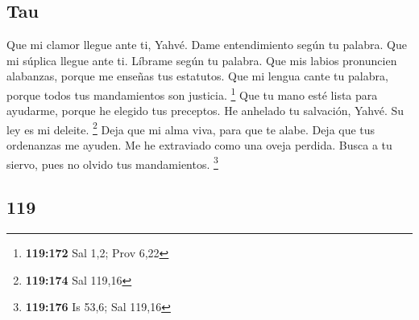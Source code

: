 \begin{paracol}{2}
\hypertarget{tau}{%
\subsection{Tau}\label{tau}}

 Que mi clamor llegue ante ti, Yahvé. Dame entendimiento
según tu palabra.  Que mi súplica llegue ante ti.
Líbrame según tu palabra.  Que mis labios pronuncien
alabanzas, porque me enseñas tus estatutos.  Que mi
lengua cante tu palabra, porque todos tus mandamientos son justicia.
\footnote{\textbf{119:172} Sal 1,2; Prov 6,22}  Que tu
mano esté lista para ayudarme, porque he elegido tus preceptos.
 He anhelado tu salvación, Yahvé. Su ley es mi deleite.
\footnote{\textbf{119:174} Sal 119,16}  Deja que mi alma
viva, para que te alabe. Deja que tus ordenanzas me ayuden.
 Me he extraviado como una oveja perdida. Busca a tu
siervo, pues no olvido tus mandamientos. \footnote{\textbf{119:176} Is
  53,6; Sal 119,16}

\switchcolumn
\begin{otherlanguage}{english}

\hypertarget{section-237}{%
\section{119}\label{section-237}}


\end{otherlanguage}
\end{paracol}

